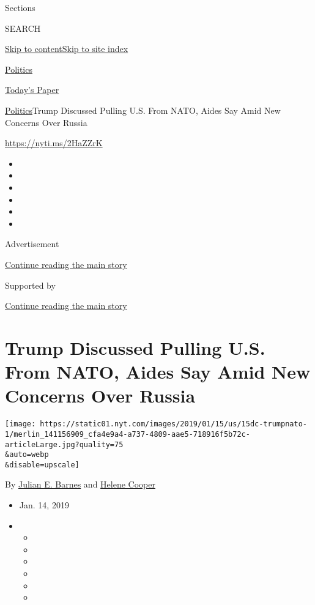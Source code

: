 Sections

SEARCH

\protect\hyperlink{site-content}{Skip to
content}\protect\hyperlink{site-index}{Skip to site index}

\href{https://www.nytimes.com/section/politics}{Politics}

\href{https://myaccount.nytimes.com/auth/login?response_type=cookie\&client_id=vi}{}

\href{https://www.nytimes.com/section/todayspaper}{Today's Paper}

\href{/section/politics}{Politics}\textbar{}Trump Discussed Pulling U.S.
From NATO, Aides Say Amid New Concerns Over Russia

\url{https://nyti.ms/2HaZZrK}

\begin{itemize}
\item
\item
\item
\item
\item
\item
\end{itemize}

Advertisement

\protect\hyperlink{after-top}{Continue reading the main story}

Supported by

\protect\hyperlink{after-sponsor}{Continue reading the main story}

\hypertarget{trump-discussed-pulling-us-from-nato-aides-say-amid-new-concerns-over-russia}{%
\section{Trump Discussed Pulling U.S. From NATO, Aides Say Amid New
Concerns Over
Russia}\label{trump-discussed-pulling-us-from-nato-aides-say-amid-new-concerns-over-russia}}

\texttt{[image: https://static01.nyt.com/images/2019/01/15/us/15dc-trumpnato-1/merlin\_141156909\_cfa4e9a4-a737-4809-aae5-718916f5b72c-articleLarge.jpg?quality=75\\\&auto=webp\\\&disable=upscale]}

By \href{https://www.nytimes.com/by/julian-e-barnes}{Julian E. Barnes}
and \href{https://www.nytimes.com/by/helene-cooper}{Helene Cooper}

\begin{itemize}
\item
  Jan. 14, 2019
\item
  \begin{itemize}
  \item
  \item
  \item
  \item
  \item
  \item
  \end{itemize}
\end{itemize}

